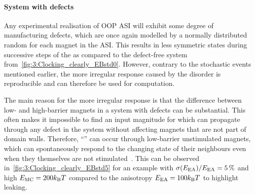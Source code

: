 \paragraph{System with defects}
Any experimental realisation of OOP ASI will exhibit some degree of manufacturing defects, which are once again modelled by a normally distributed random  for each magnet in the ASI.
This results in less symmetric states during successive steps of the  as compared to the defect-free system from~\cref{fig:3:Clocking_clearly_EBstd0}.
However, contrary to the stochastic events mentioned earlier, the more irregular response caused by the disorder is reproducible and can therefore be used for computation. \par
The main reason for the more irregular response is that the difference between low- and high-barrier magnets in a system with defects can be substantial.
This often makes it impossible to find an input magnitude for which  can propagate through any defect in the system without affecting magnets that are not part of domain walls.
Therefore, ``'' can occur through low-barrier unstimulated magnets, which can spontaneously respond to the changing state of their neighbours even when they themselves are not stimulated~\cite{DisorderGroundStateASI}. %
This can be observed in~\cref{fig:3:Clocking_clearly_EBstd5} for an example with $\sigma(E_\mathrm{EA})/E_\mathrm{EA} = \SI{5}{\percent}$ and high  $\EMC = 200 \kBT$ compared to the anisotropy $\EEA = 100 \kBT$ to highlight leaking.


